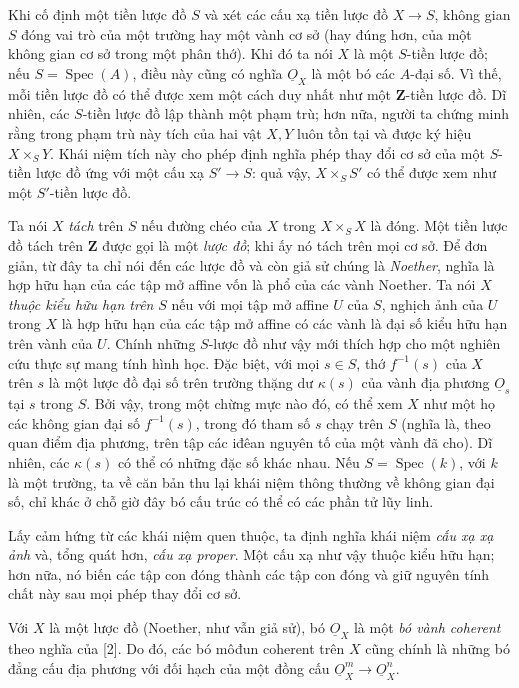 \documentclass[11pt,twoside,openany]{book}
\numberwithin{equation}{section}
\newcommand{\src}[1]{%
  \phantomsection\hypertarget{src:\fgasourceid:#1}{}%
  \marginpar{\raggedleft\footnotesize\sffamily #1}%
}
\newcommand{\fgasourceid}{unset}
\newcommand{\Osh}{\underline{O}}
\newcommand{\fquote}[1]{\textquotedbl#1\textquotedbl}
\begin{document}
Khi cố định một tiền lược đồ $S$ và xét các cấu xạ tiền lược đồ
$X\longrightarrow S$, không gian $S$ đóng vai trò của một trường hay một vành
cơ sở (hay đúng hơn, của một không gian cơ sở trong một phân thớ). Khi đó ta
nói $X$ là một $S$-tiền lược đồ; nếu $S=\operatorname{Spec}(A)$, điều này cũng
có nghĩa $\Osh_X$ là một bó các $A$-đại số. Vì thế, mỗi tiền lược đồ có thể
được xem một cách duy nhất như một $\mathbf Z$-tiền lược đồ. Dĩ nhiên, các
$S$-tiền lược đồ lập thành một phạm trù; hơn nữa, người ta chứng minh rằng
trong phạm trù này tích của hai vật $X,Y$ luôn tồn tại và được ký hiệu
$X\times_S Y$. Khái niệm tích này cho phép định nghĩa phép thay đổi cơ sở của
một $S$-tiền lược đồ ứng với một cấu xạ $S'\longrightarrow S$: quả vậy,
$X\times_S S'$ có thể được xem như một $S'$-tiền lược đồ.

Ta nói $X$ \emph{tách} trên $S$ nếu đường chéo của $X$ trong
$X\times_S X$ là đóng. Một tiền lược đồ tách trên $\mathbf Z$ được gọi là một
\emph{lược đồ}; khi ấy nó tách trên mọi cơ sở. Để đơn giản, từ đây ta chỉ nói
đến các lược đồ và còn giả sử chúng là \emph{Noether}, nghĩa là hợp hữu hạn
của các tập mở affine vốn là phổ của các vành Noether. Ta nói $X$ \emph{thuộc
kiểu hữu hạn trên} $S$ nếu với mọi tập mở affine $U$ của $S$, nghịch ảnh của
$U$ trong $X$ là hợp hữu hạn của các tập mở affine có các vành là đại số kiểu
hữu hạn trên vành của $U$. Chính những $S$-lược đồ như vậy mới thích hợp cho
một nghiên cứu thực sự mang tính hình học. Đặc biệt, với mọi $s\in S$, thớ
$f^{-1}(s)$ của $X$ trên $s$ là một lược đồ đại số trên trường thặng dư
$\kappa(s)$ của vành địa phương $\Osh_s$ tại $s$ trong $S$. Bởi vậy, trong một
chừng mực nào đó, có thể xem $X$ như một họ các \fquote{không gian đại số}
$f^{-1}(s)$, trong đó tham số $s$ chạy trên $S$ (nghĩa là, theo quan điểm địa
phương, trên tập các iđêan nguyên tố của một vành đã cho). Dĩ nhiên, các
$\kappa(s)$ có thể có những đặc số khác nhau. Nếu
$S=\operatorname{Spec}(k)$, với $k$ là một trường, ta về căn bản thu lại khái
niệm thông thường về \fquote{không gian đại số}, chỉ khác ở chỗ giờ đây bó cấu
trúc có thể có các phần tử lũy linh.

\src{195}
Lấy cảm hứng từ các khái niệm quen thuộc, ta định nghĩa khái niệm
\emph{cấu xạ xạ ảnh} và, tổng quát hơn, \emph{cấu xạ proper}. Một cấu xạ như
vậy thuộc kiểu hữu hạn; hơn nữa, nó biến các tập con đóng thành các tập con
đóng và giữ nguyên tính chất này sau mọi phép thay đổi cơ sở.

Với $X$ là một lược đồ (Noether, như vẫn giả sử), bó $\Osh_X$ là một
\emph{bó vành coherent} theo nghĩa của [2]. Do đó, các bó môđun coherent trên
$X$ cũng chính là những bó đẳng cấu địa phương với đối hạch của một đồng cấu
$\Osh_X^{m}\longrightarrow\Osh_X^{n}$.
\end{document}
